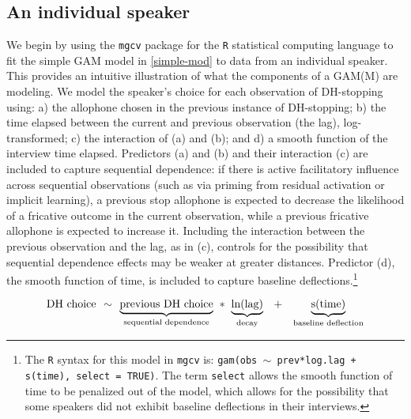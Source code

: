 \documentclass[12pt]{article}
\begin{document}
\subsection{An individual speaker} \label{individual}

We begin by using the \texttt{mgcv} package for the \texttt{R} statistical computing language \citep{R2015,wood2016} to fit the simple GAM model in \eqref{simple-mod} to data from an individual speaker. This provides an intuitive illustration of what the components of a GAM(M) are modeling. 
We model the speaker's choice for each observation of DH-stopping using: a) the allophone chosen in the previous instance of DH-stopping; b) the time elapsed between the current and previous observation (the lag), log-transformed; c) the interaction of (a) and (b); and d) a smooth function of the interview time elapsed.
Predictors (a) and (b) and their interaction (c) are included to capture sequential dependence: if there is active facilitatory influence across sequential observations (such as via priming from residual activation or implicit learning), a previous stop allophone is expected to decrease the likelihood of a fricative outcome in the current observation, while a previous fricative allophone is expected to increase it. Including the interaction between the previous observation and the lag, as in (c), controls for the possibility that sequential dependence effects may be weaker at greater distances.  
Predictor (d), the smooth function of time, is included to capture baseline deflections.\footnote{The \texttt{R} syntax for this model in \texttt{mgcv} is: \texttt{gam(obs $\sim$ prev*log.lag + s(time), select = TRUE)}. The term \texttt{select} allows the smooth function of time to be penalized out of the model, which allows for the possibility that some speakers did not exhibit baseline deflections in their interviews.}

\begin{equation} \label{simple-mod}
  \text{DH choice} \hspace{4pt} \sim
 \hspace{4pt}
  \underbrace{\text{previous DH choice}}_{\text{sequential dependence}} \hspace{4pt} 
  * \hspace{4pt} 
  \underbrace{\text{ln(lag)}}_{\text{decay}}
  \hspace{8pt}
  + \hspace{8pt}  
    \underbrace{\text{s(time)}}_{\substack{\text{baseline deflection}}} 
  \vspace{12pt}
\end{equation}
\end{document}
